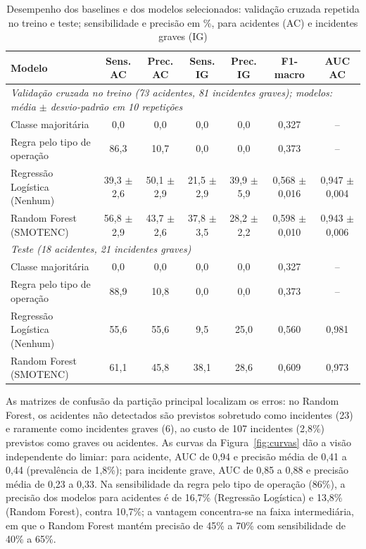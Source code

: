 \documentclass[12pt]{article}
\begin{document}
\begin{table}[htbp]
    \centering
    \caption{Desempenho dos baselines e dos modelos selecionados: validação cruzada repetida no treino e teste; sensibilidade e precisão em \%, para acidentes (AC) e incidentes graves (IG)}
    \vspace{0.05cm}
    \scriptsize\setlength{\tabcolsep}{3.5pt}\renewcommand{\arraystretch}{0.88}
    \begin{tabular}{lcccccc}
\toprule
\textbf{Modelo} & \textbf{Sens. AC} & \textbf{Prec. AC} & \textbf{Sens. IG} & \textbf{Prec. IG} & \textbf{F1-macro} & \textbf{AUC AC} \\
\midrule
\multicolumn{7}{l}{\textit{Validação cruzada no treino (73 acidentes, 81 incidentes graves); modelos: média $\pm$ desvio-padrão em 10 repetições}} \\
Classe majoritária & 0,0 & 0,0 & 0,0 & 0,0 & 0,327 & -- \\
Regra pelo tipo de operação & 86,3 & 10,7 & 0,0 & 0,0 & 0,373 & -- \\
Regressão Logística (Nenhum) & 39,3 $\pm$ 2,6 & 50,1 $\pm$ 2,9 & 21,5 $\pm$ 2,9 & 39,9 $\pm$ 5,9 & 0,568 $\pm$ 0,016 & 0,947 $\pm$ 0,004 \\
Random Forest (SMOTENC) & 56,8 $\pm$ 2,9 & 43,7 $\pm$ 2,6 & 37,8 $\pm$ 3,5 & 28,2 $\pm$ 2,2 & 0,598 $\pm$ 0,010 & 0,943 $\pm$ 0,006 \\
\midrule
\multicolumn{7}{l}{\textit{Teste (18 acidentes, 21 incidentes graves)}} \\
Classe majoritária & 0,0 & 0,0 & 0,0 & 0,0 & 0,327 & -- \\
Regra pelo tipo de operação & 88,9 & 10,8 & 0,0 & 0,0 & 0,373 & -- \\
Regressão Logística (Nenhum) & 55,6 & 55,6 & 9,5 & 25,0 & 0,560 & 0,981 \\
Random Forest (SMOTENC) & 61,1 & 45,8 & 38,1 & 28,6 & 0,609 & 0,973 \\
\bottomrule
\end{tabular}
    \label{tab:metricas}
\end{table}

As matrizes de confusão da partição principal localizam os erros: no Random Forest, os acidentes não detectados são previstos sobretudo como incidentes (23) e raramente como incidentes graves (6), ao custo de 107 incidentes (2,8\%) previstos como graves ou acidentes. As curvas da Figura~\ref{fig:curvas} dão a visão independente do limiar: para acidente, AUC de 0,94 e precisão média de 0,41 a 0,44 (prevalência de 1,8\%); para incidente grave, AUC de 0,85 a 0,88 e precisão média de 0,23 a 0,33. Na sensibilidade da regra pelo tipo de operação (86\%), a precisão dos modelos para acidentes é de 16,7\% (Regressão Logística) e 13,8\% (Random Forest), contra 10,7\%; a vantagem concentra-se na faixa intermediária, em que o Random Forest mantém precisão de 45\% a 70\% com sensibilidade de 40\% a 65\%.
\end{document}
